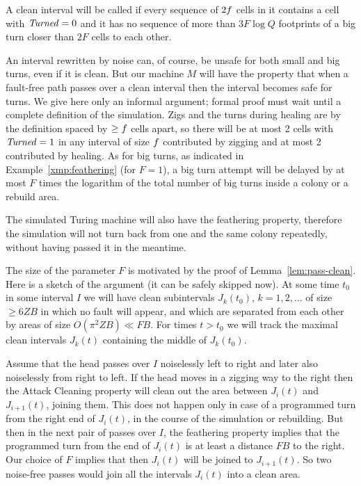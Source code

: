 \documentclass[11pt]{memoir}
\theoremstyle{definition} %
\renewcommand{\ge}{\geq}
\newcommand{\fld}[1]{\ensuremath{\textit{#1\/}}}
\def\B{B}
\newcommand{\F}{F}
\newcommand{\passno}{\pi}
\newcommand{\Q}{Q} %
\newcommand{\Z}{Z} %
\newcommand{\Turned}{\fld{Turned}} %
\begin{document}
\begin{definition}\label{def:safe-for-turns}
  A clean interval will be called  if every sequence of \( 2f \) cells in it contains a cell with
  \( \Turned=0 \) and it has no sequence of more than \( 3\F\log\Q \) footprints of a big turn closer than \( 2\F \)
  cells to each other.
\end{definition}

An interval rewritten by noise can, of course, be unsafe for both small and big turns, even if it is clean.
But our machine \( M \) will have the property that when a fault-free
path passes over a clean interval then
the interval becomes safe for turns.
We give here only an informal argument; formal proof must wait until 
a complete definition of the simulation.
Zigs and the turns during healing are by the definition spaced by \( \ge\f \) cells apart, so
there will be at most 2 cells with \( \Turned=1 \) in any interval of size \( f \)
contributed by zigging and at most 2 contributed by healing.
As for big turns, as indicated in Example~\ref{xmp:feathering} (for \( \F=1 \)),
a big turn attempt will be delayed by at most \( \F \) times the logarithm
of the total number of big turns inside a colony or a rebuild area.

The simulated Turing machine will also have the feathering property,
therefore the simulation will not turn back 
from one and the same colony repeatedly, without having passed it in the meantime.

\begin{sloppypar}
\begin{remark}\label{rem:big-turns}
  The size of the parameter \( \F \) is motivated by the proof of Lemma~\ref{lem:pass-clean}.
  Here is a sketch of the argument (it can be safely skipped now).
   At some time \( t_{0} \) in some interval \( I \)
  we will have clean subintervals \( J_{k}(t_{0}) \), \( k=1,2,\dots \)
  of size \( \ge 6\Z\B \) in which no fault will appear, and which are separated from each other by areas of
  size \( O(\passno^{2}\Z\B)\ll\F\B \).
  For times \( t>t_{0} \) we will track the maximal clean intervals \( J_{k}(t) \) containing
  the middle of \( J_{k}(t_{0}) \).

  Assume that the head passes over \( I \) noiselessly left to right and later
  also noiselessly from right to left.
  If the head moves in a zigging way to the
  right then the Attack Cleaning property will clean out the area between \( J_{i}(t) \) and \( J_{i+1}(t) \),
  joining them.
  This does not happen only in case of a programmed turn
  from the right end of \( J_{i}(t) \), in the course of the simulation or rebuilding.
  But then in the next pair of passes over \( I \), the feathering property implies that
  the programmed turn from the end of \( J_{i}(t) \) is at least a distance \( \F\B \) to the right.
  Our choice of \( \F \) implies that then \( J_{i}(t) \) will be joined to \( J_{i+1}(t) \).
  So two noise-free passes would join all the intervals \( J_{i}(t) \) into a clean area.  
\end{remark}  
\end{sloppypar}
\end{document}
